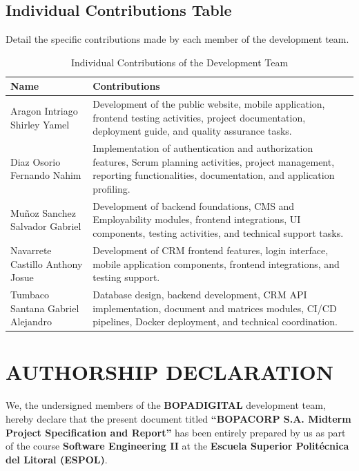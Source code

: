 \documentclass[letterpaper%
, oneside%
, 12pt%
, memoireprojet%
, english%
,creativecommons,hyperref, withAlgo2e %
]{thETS}
\begin{document}
\section{Individual Contributions Table}
Detail the specific contributions made by each member of the development team.
\begin{table}[H]
\centering
\begin{tabular}{|p{4.5cm}|p{9cm}|}
\hline
\textbf{Name} & \textbf{Contributions} \\ \hline
Aragon Intriago Shirley Yamel &
Development of the public website, mobile application, frontend testing activities, project documentation, deployment guide, and quality assurance tasks. \\ \hline

Diaz Osorio Fernando Nahim &
Implementation of authentication and authorization features, Scrum planning activities, project management, reporting functionalities, documentation, and application profiling. \\ \hline

Muñoz Sanchez Salvador Gabriel &
Development of backend foundations, CMS and Employability modules, frontend integrations, UI components, testing activities, and technical support tasks. \\ \hline

Navarrete Castillo Anthony Josue &
Development of CRM frontend features, login interface, mobile application components, frontend integrations, and testing support. \\ \hline

Tumbaco Santana Gabriel Alejandro &
Database design, backend development, CRM API implementation, document and matrices modules, CI/CD pipelines, Docker deployment, and technical coordination. \\ \hline

\end{tabular}
\caption{Individual Contributions of the Development Team}
\label{tab:individual_contributions}
\end{table}

\chapter{AUTHORSHIP DECLARATION}

We, the undersigned members of the \textbf{BOPADIGITAL} development team, hereby declare that the present document titled \textbf{“BOPACORP S.A. Midterm Project Specification and Report”} has been entirely prepared by us as part of the course \textbf{Software Engineering II} at the \textbf{Escuela Superior Politécnica del Litoral (ESPOL)}.
\end{document}
